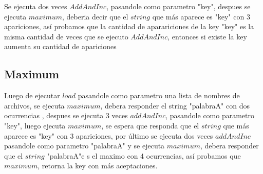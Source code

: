 Se ejecuta dos veces $AddAndInc$, pasandole como parametro "key", despues se
ejecuta $maximum$, deberia decir que el $string$ que más aparece es "key" con 3
apariciones, así probamos que la cantidad de aparariciones de la key "key" es
la misma cantidad de veces que se ejecuto $AddAndInc$, entonces si existe la
key aumenta su cantidad de apariciones

\subsection{Maximum}

Luego de ejecutar $load$ pasandole como parametro una lista de nombres de
archivos, se ejecuta $maximum$, debera responder el string "palabraA" con dos
ocurrencias , despues se ejecuta 3 veces $addAndInc$, pasandole como parametro
"key", luego ejecuta $maximum$, se espera que responda que el $string$ que más
aparece es "key" con 3 apariciones, por último se ejecuta dos veces $addAndInc$
pasandole como parametro "palabraA" y se ejecuta $maximum$, debera responder
que el $string$  "palabraA"e s el maximo con 4 ocurrencias, así probamos que
$maximum$, retorna la key con más aceptaciones. 
